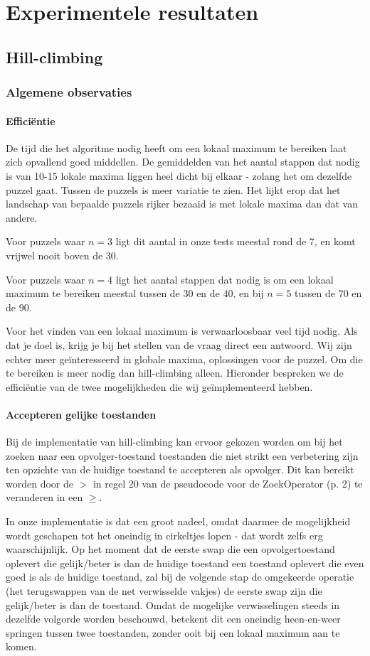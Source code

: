 \documentclass[]{report}
\begin{document}
\chapter{Experimentele resultaten}
\section{Hill-climbing}
\subsection{Algemene observaties}
\subsubsection{Effici\"{e}ntie}
De tijd die het algoritme nodig heeft om een lokaal maximum te bereiken laat zich opvallend goed middellen. De gemiddelden van het aantal stappen dat nodig is van 10-15 lokale maxima liggen heel dicht bij elkaar - zolang het om dezelfde puzzel gaat. Tussen de puzzels is meer variatie te zien. Het lijkt erop dat het landschap van bepaalde puzzels rijker bezaaid is met lokale maxima dan dat van andere.

Voor puzzels waar $n=3$ ligt dit aantal in onze tests meestal rond de 7, en komt vrijwel nooit boven de 30. 

Voor puzzels waar $n=4$ ligt het aantal stappen dat nodig is om een lokaal maximum te bereiken meestal tussen de 30 en de 40, en bij $n=5$ tussen de 70 en de 90.

Voor het vinden van een lokaal maximum is verwaarloosbaar veel tijd nodig. Als dat je doel is, krijg je bij het stellen van de vraag direct een antwoord. Wij zijn echter meer geïnteresseerd in globale maxima, oplossingen voor de puzzel. Om die te bereiken is meer nodig dan hill-climbing alleen. Hieronder bespreken we de effici\"{e}ntie van de twee mogelijkheden die wij ge\"{i}mplementeerd hebben.

\subsubsection{Accepteren gelijke toestanden}
Bij de implementatie van hill-climbing kan ervoor gekozen worden om bij het zoeken naar een opvolger-toestand toestanden die niet strikt een verbetering zijn ten opzichte van de huidige toestand te accepteren als opvolger. Dit kan bereikt worden door de $>$ in regel 20 van de pseudocode voor de ZoekOperator (p. 2) te veranderen in een $\geq$.

In onze implementatie is dat een groot nadeel, omdat daarmee de mogelijkheid wordt geschapen tot het oneindig in cirkeltjes lopen - dat wordt zelfs erg waarschijnlijk. Op het moment dat de eerste swap die een opvolgertoestand oplevert die gelijk/beter is dan de huidige toestand een toestand oplevert die even goed is als de huidige toestand, zal bij de volgende stap de omgekeerde operatie (het terugswappen van de net verwisselde vakjes) de eerste swap zijn die gelijk/beter is dan de toestand. Omdat de mogelijke verwisselingen steeds in dezelfde volgorde worden beschouwd, betekent dit een oneindig heen-en-weer springen tussen twee toestanden, zonder ooit bij een lokaal maximum aan te komen.
\end{document}
